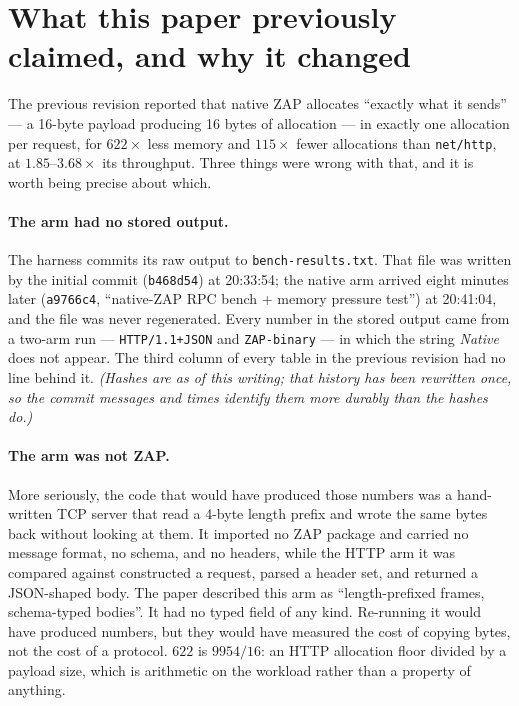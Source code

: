 \documentclass[11pt]{article}
\begin{document}
\section{What this paper previously claimed, and why it changed}
\label{sec:correction}

The previous revision reported that native ZAP allocates ``exactly what it
sends'' --- a 16-byte payload producing 16 bytes of allocation --- in exactly one
allocation per request, for $622\times$ less memory and $115\times$ fewer
allocations than \texttt{net/http}, at $1.85$--$3.68\times$ its throughput. Three
things were wrong with that, and it is worth being precise about which.

\paragraph{The arm had no stored output.} The harness commits its raw output to
\texttt{bench-results.txt}. That file was written by the initial commit
(\texttt{b468d54}) at 20:33:54; the native arm arrived eight minutes later
(\texttt{a9766c4}, ``native-ZAP RPC bench + memory pressure test'') at 20:41:04,
and the file was never regenerated. Every number in the stored output came from a
two-arm run --- \texttt{HTTP/1.1+JSON} and \texttt{ZAP-binary} --- in which the
string \emph{Native} does not appear. The third column of every table in the
previous revision had no line behind it. \emph{(Hashes are as of this writing;
that history has been rewritten once, so the commit messages and times identify
them more durably than the hashes do.)}

\paragraph{The arm was not ZAP.} More seriously, the code that would have produced
those numbers was a hand-written TCP server that read a 4-byte length prefix and
wrote the same bytes back without looking at them. It imported no ZAP package and
carried no message format, no schema, and no headers, while the HTTP arm it was
compared against constructed a request, parsed a header set, and returned a
JSON-shaped body. The paper described this arm as ``length-prefixed frames,
schema-typed bodies''. It had no typed field of any kind. Re-running it would have
produced numbers, but they would have measured the cost of copying bytes, not the
cost of a protocol. $622$ is $9954/16$: an HTTP allocation floor divided by a
payload size, which is arithmetic on the workload rather than a property of
anything.
\end{document}
